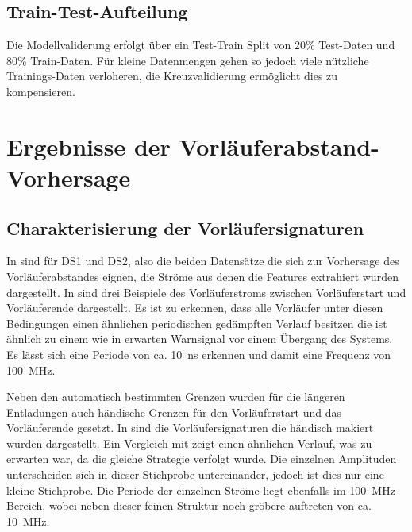 \subsection{Train-Test-Aufteilung}
Die Modellvaliderung erfolgt über ein Test-Train Split von 20\% Test-Daten und 80\% Train-Daten. Für kleine Datenmengen gehen so jedoch viele nützliche Trainings-Daten verloheren, die Kreuzvalidierung ermöglicht dies zu kompensieren.


\section{Ergebnisse der Vorläuferabstand-Vorhersage}

\subsection{Charakterisierung der Vorläufersignaturen}
In  sind für DS1 und DS2, also die beiden Datensätze die sich zur Vorhersage des Vorläuferabstandes eignen, die Ströme aus denen die Features extrahiert wurden dargestellt. In  sind drei Beispiele des Vorläuferstroms zwischen Vorläuferstart und Vorläuferende dargestellt. Es ist zu erkennen, dass alle Vorläufer unter diesen Bedingungen einen ähnlichen periodischen gedämpften Verlauf besitzen die ist ähnlich zu einem wie in  erwarten Warnsignal vor einem Übergang des Systems.  Es lässt sich eine Periode von ca. \SI{10}{\nano\second} erkennen und damit eine Frequenz von \SI{100}{\mega\hertz}.

Neben den automatisch bestimmten Grenzen wurden für die längeren Entladungen auch händische Grenzen für den Vorläuferstart und das Vorläuferende gesetzt. In  sind die Vorläufersignaturen die händisch makiert wurden dargestellt. Ein Vergleich mit  zeigt einen ähnlichen Verlauf, was zu erwarten war, da die gleiche Strategie verfolgt wurde. Die einzelnen Amplituden unterscheiden sich in dieser Stichprobe untereinander, jedoch ist dies nur eine kleine Stichprobe. Die Periode der einzelnen Ströme liegt ebenfalls im \SI{100}{\mega\hertz} Bereich, wobei neben dieser feinen Struktur noch gröbere auftreten von ca. \SI{10}{\mega\hertz}.

